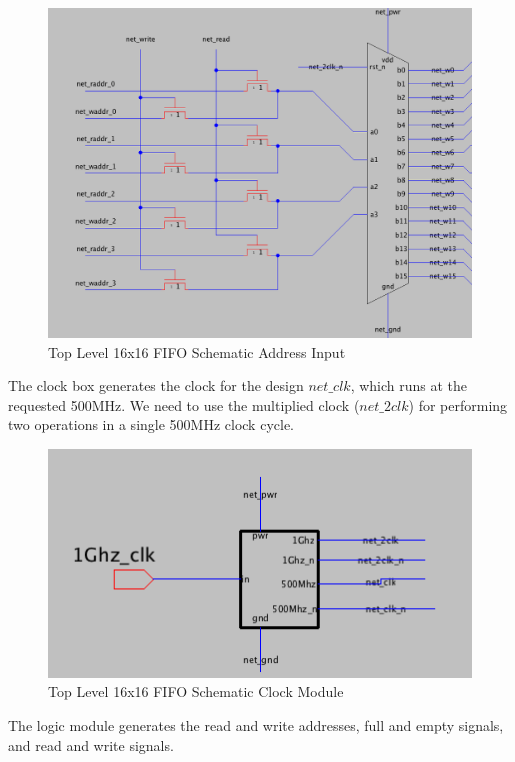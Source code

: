 \documentclass[a4paper]{article}
\begin{document}
\begin{figure}[H]
	\centering
	\includegraphics[scale=0.3]{topLevelSchematicLeft}
	\caption{Top Level 16x16 FIFO Schematic Address Input}
	\label{fig:topLevelSchematicLeft}
\end{figure}

The clock box generates the clock for the design $net\_clk$, which runs at the requested 500MHz. We need to use the multiplied clock ($net\_2clk$) for performing two operations in a single 500MHz clock cycle. 

\begin{figure}[H]
	\centering
	\includegraphics[scale=0.65]{topLevelSchematicClockBox}
	\caption{Top Level 16x16 FIFO Schematic Clock Module}
	\label{fig:topLevelSchematicClockBox}
\end{figure}

The logic module generates the read and write addresses, full and empty signals, and read and write signals.
\end{document}
